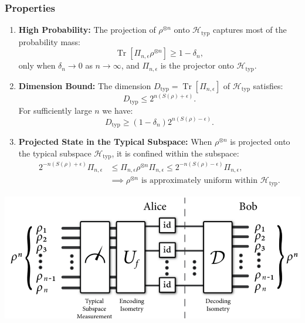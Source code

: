 \subsubsection{Properties}

\begin{enumerate}
    \item \textbf{High Probability:} The projection of \(\rho^{\otimes n}\) onto \(\mathcal{H}_{\text{typ}}\) captures most of the probability mass:
    \[
    \operatorname{Tr}[\Pi_{n, \epsilon} \rho^{\otimes n}] \geq 1 - \delta_n,
    \]
    only when \(\delta_n \to 0\) as \(n \to \infty\), and \(\Pi_{n, \epsilon}\) is the projector onto \(\mathcal{H}_{\text{typ}}\).

    \item \textbf{Dimension Bound:} The dimension \(D_{\text{typ}} = \operatorname{Tr}[\Pi_{n, \epsilon}]\) of \(\mathcal{H}_{\text{typ}}\) satisfies:
    \[
    D_{\text{typ}} \leq 2^{n(S(\rho) + \epsilon)}.
    \]
    For sufficiently large \(n\) we have:
    \[
    D_{\text{typ}} \geq (1 - \delta_n) 2^{n(S(\rho) - \epsilon)}.
    \]

\item \textbf{Projected State in the Typical Subspace:} 
When $\rho^{\otimes n}$ is projected onto the typical subspace $\mathcal{H}_{\text{typ}}$, it is confined within the subspace: 
\[
\begin{aligned}
    2^{-n(S(\rho) + \epsilon)} \Pi_{n, \epsilon} &\leq \Pi_{n, \epsilon} \rho^{\otimes n} \Pi_{n, \epsilon} \leq 2^{-n(S(\rho) - \epsilon)} \Pi_{n, \epsilon}, \\
    &\implies \rho^{\otimes n} \text{ is approximately uniform within } \mathcal{H}_{\text{typ}}.
\end{aligned}
\]

\end{enumerate}

\begin{center}
    \includegraphics[width=1\textwidth]{figures/schumacher.png}
\end{center}


